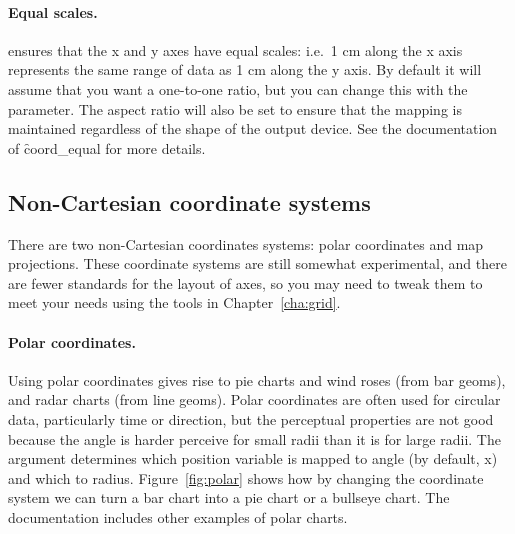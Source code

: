% 


\paragraph{Equal scales.}   ensures that the x and y axes have equal scales: i.e.\ 1 cm along the x axis represents the same range of data as 1 cm along the y axis.  By default it will assume that you want a one-to-one ratio, but you can change this with the  parameter.  The aspect ratio will also be set to ensure that the mapping is maintained regardless of the shape of the output device.  See the documentation of \f{coord_equal} for more details.

\subsection{Non-Cartesian coordinate systems}

There are two non-Cartesian coordinates systems: polar coordinates and map projections.  These coordinate systems are still somewhat experimental, and there are fewer standards for the layout of axes, so you may need to tweak them to meet your needs using the tools in Chapter~\ref{cha:grid}.

\paragraph{Polar coordinates.}  Using polar coordinates gives rise to pie charts and wind roses (from bar geoms), and radar charts (from line geoms).  Polar coordinates are often used for circular data, particularly time or direction, but the perceptual properties are not good because the angle is harder perceive for small radii than it is for large radii.  The  argument determines which position variable is mapped to angle (by default, x) and which to radius.  Figure~\ref{fig:polar} shows how by changing the coordinate system we can turn a bar chart into a pie chart or a bullseye chart.  The documentation includes other examples of polar charts.

